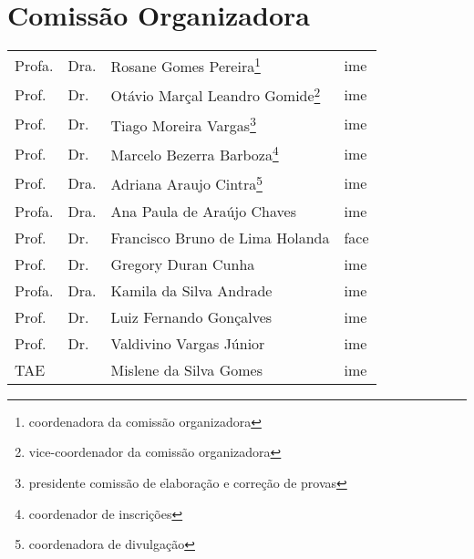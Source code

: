 \section*{Comissão Organizadora}

\begin{table}[H]
  \centering
  \begin{tabular}{llll}
    Profa. & Dra. & Rosane Gomes Pereira\footnote{coordenadora da comissão organizadora}                  & \acrshort{ime}  \\
    Prof.  & Dr.  & Otávio Marçal Leandro Gomide\footnote{vice-coordenador da comissão organizadora}      & \acrshort{ime}  \\
    Prof.  & Dr.  & Tiago Moreira Vargas\footnote{presidente comissão de elaboração e correção de provas} & \acrshort{ime}  \\
    Prof.  & Dr.  & Marcelo Bezerra Barboza\footnote{coordenador de inscrições}                           & \acrshort{ime}  \\
    Prof.  & Dra. & Adriana Araujo Cintra\footnote{coordenadora de divulgação}                            & \acrshort{ime}  \\
    Profa. & Dra. & Ana Paula de Araújo Chaves                                                            & \acrshort{ime}  \\
    Prof.  & Dr.  & Francisco Bruno de Lima Holanda                                                       & \acrshort{face} \\
    Prof.  & Dr.  & Gregory Duran Cunha                                                                   & \acrshort{ime}  \\
    Profa. & Dra. & Kamila da Silva Andrade                                                               & \acrshort{ime}  \\
    Prof.  & Dr.  & Luiz Fernando Gonçalves                                                               & \acrshort{ime}  \\
    Prof.  & Dr.  & Valdivino Vargas Júnior                                                               & \acrshort{ime}  \\
    TAE    &      & Mislene da Silva Gomes                                                                & \acrshort{ime}
  \end{tabular}
\end{table}
